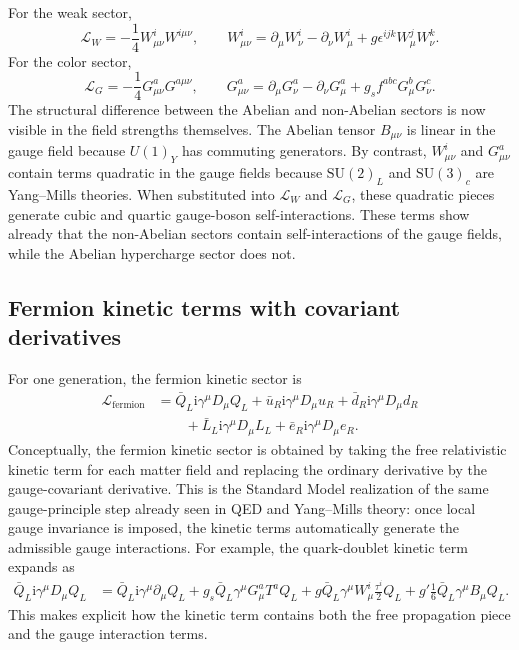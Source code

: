 \documentclass[11pt,a4paper]{article}
\newcommand{\Lag}{\mathcal{L}}
\newcommand{\ii}{\mathrm{i}}
\newcommand{\p}{\partial}
\newcommand{\gmu}{\gamma^\mu}
\newcommand{\SUc}{\mathrm{SU}(3)_c}
\newcommand{\SUw}{\mathrm{SU}(2)_L}
\begin{document}
For the weak sector,
\begin{equation}
\Lag_W=-\frac14 W_{\mu\nu}^iW^{i\mu\nu},
\qquad
W_{\mu\nu}^i=\p_\mu W_\nu^i-\p_\nu W_\mu^i+g\epsilon^{ijk}W_\mu^jW_\nu^k.
\label{eq:weak-kinetic-expanded}
\end{equation}
For the color sector,
\begin{equation}
\Lag_G=-\frac14 G_{\mu\nu}^aG^{a\mu\nu},
\qquad
G_{\mu\nu}^a=\p_\mu G_\nu^a-\p_\nu G_\mu^a+g_sf^{abc}G_\mu^bG_\nu^c.
\label{eq:color-kinetic-expanded}
\end{equation} 
The structural difference between the Abelian and non-Abelian sectors is now visible in the field strengths themselves. The Abelian tensor \(B_{\mu\nu}\) is linear in the gauge field because \(U(1)_Y\) has commuting generators. By contrast, \(W_{\mu\nu}^i\) and \(G_{\mu\nu}^a\) contain terms quadratic in the gauge fields because \(\SUw\) and \(\SUc\) are Yang--Mills theories. When substituted into \(\Lag_W\) and \(\Lag_G\), these quadratic pieces generate cubic and quartic gauge-boson self-interactions. 
These terms show already that the non-Abelian sectors contain self-interactions of the gauge fields, while the Abelian hypercharge sector does not.




\subsection{Fermion kinetic terms with covariant derivatives}

For one generation, the fermion kinetic sector is
\begin{align}
\Lag_{\text{fermion}}
&=
\bar Q_L\ii\gmu D_\mu Q_L + \bar u_R\ii\gmu D_\mu u_R + \bar d_R\ii\gmu D_\mu d_R
\nonumber\\
&\qquad
+\bar L_L\ii\gmu D_\mu L_L + \bar e_R\ii\gmu D_\mu e_R.
\label{eq:fermion-kinetics-expanded}
\end{align}
Conceptually, the fermion kinetic sector is obtained by taking the free relativistic kinetic term for each matter field and replacing the ordinary derivative by the gauge-covariant derivative. This is the Standard Model realization of the same gauge-principle step already seen in QED and Yang--Mills theory: once local gauge invariance is imposed, the kinetic terms automatically generate the admissible gauge interactions. 
For example, the quark-doublet kinetic term expands as
\begin{align}
	\bar Q_L \ii \gmu D_\mu Q_L
	&=
	\bar Q_L \ii \gmu \p_\mu Q_L
	+ g_s \bar Q_L \gmu G_\mu^a T^a Q_L
	+ g \bar Q_L \gmu W_\mu^i \frac{\tau^i}{2} Q_L
	+ g' \frac16 \bar Q_L \gmu B_\mu Q_L.
	\label{eq:fermion-kinetic-example-QL}
\end{align}
This makes explicit how the kinetic term contains both the free propagation piece and the gauge interaction terms.
\end{document}
